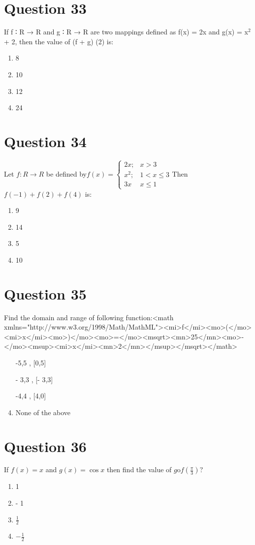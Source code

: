 \documentclass{article}
\begin{document}
\section*{Question 33}
If f ∶ R → R and g ∶ R → R are two mappings defined as f(x) = 2x and g(x) = x$^{2}$ + 2, then the value of (f + g) (2) is:\newline
\begin{enumerate}[label=(\alph*)]
\item 8
\item 10
\item 12
\item 24
\end{enumerate}
\newpage
\section*{Question 34}
Let \(f: R \rightarrow R\) be defined by\(f(x)=\left\{\begin{array}{cc}2 x ; & x>3 \\ x^{2} ; & 1<x \leq 3 \\ 3 x & x \leq 1\end{array}\right.\)Then \(f(-1)+f(2)+f(4)\) is:
\begin{enumerate}[label=(\alph*)]
\item 9
\item 14
\item 5
\item 10
\end{enumerate}
\newpage
\section*{Question 35}
Find the domain and range of following function:<math xmlns="http://www.w3.org/1998/Math/MathML"><mi>f</mi><mo>(</mo><mi>x</mi><mo>)</mo><mo>=</mo><msqrt><mn>25</mn><mo>-</mo><msup><mi>x</mi><mn>2</mn></msup></msqrt></math>\newline
\begin{enumerate}[label=(\alph*)]
\item [-5,5], [0,5]
\item [- 3,3], [- 3,3]
\item [-4,4], [4,0]
\item None of the above
\end{enumerate}
\newpage
\section*{Question 36}
If \(f(x)=x\) and \(g(x)=\cos x\) then find the value of \(g\)o\(f(\frac{\pi}{3}) ?\)
\begin{enumerate}[label=(\alph*)]
\item 1
\item - 1
\item \(\frac{1}{2}\)
\item \(-\frac{1}{2}\)
\end{enumerate}
\newpage
\end{document}
